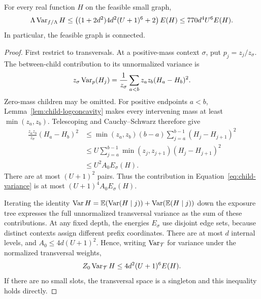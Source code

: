 \begin{theorem}\label{thm:poincare}
For every real function $H$ on the feasible small graph,
\begin{equation}\label{eq:graph-poincare}
 \Lambda\operatorname{Var}_{f/\Lambda}H
 \le \left((1+2d^2)4d^2(U+1)^6+2\right)E(H)
 \le 770d^4U^6 E(H).
\end{equation}
In particular, the feasible graph is connected.
\end{theorem}
\begin{proof}
First restrict to transversals.  At a positive-mass context $\sigma$,
put $p_j=z_j/z_\sigma$.  The between-child contribution to its
unnormalized variance is
\begin{equation}\label{eq:child-variance}
 z_\sigma\operatorname{Var}_p(H_j)
 =\frac1{z_\sigma}\sum_{a<b}z_a z_b(H_a-H_b)^2.
\end{equation}
Zero-mass children may be omitted.  For positive endpoints $a<b$,
Lemma~\ref{lem:child-logconcavity} makes every intervening mass at least
$\min(z_a,z_b)$.  Telescoping and Cauchy--Schwarz therefore give
\begin{align*}
 \frac{z_a z_b}{z_\sigma}(H_a-H_b)^2
 &\le \min(z_a,z_b)(b-a)
             \sum_{j=a}^{b-1}(H_j-H_{j+1})^2\\
 &\le U\sum_{j=a}^{b-1}\min(z_j,z_{j+1})(H_j-H_{j+1})^2\\
 &\le U^2 A_0 E_\sigma(H).
\end{align*}
There are at most $(U+1)^2$ pairs.  Thus the contribution in
Equation~\eqref{eq:child-variance} is at most
$(U+1)^4A_0 E_\sigma(H)$.

Iterating the identity
$\operatorname{Var} H=\mathbb{E}(\operatorname{Var}(H\mid j))+\operatorname{Var}(\mathbb{E}(H\mid j))$ down the exposure tree
expresses the full unnormalized transversal variance as the sum of
these contributions.  At any fixed depth, the energies $E_\sigma$
use disjoint edge sets, because distinct contexts assign different
prefix coordinates.  There are at most $d$ internal levels, and
$A_0\le4d(U+1)^2$.  Hence, writing $\operatorname{Var}_{\mathcal T}$ for variance
under the normalized transversal weights,
\begin{equation}\label{eq:transversal-variance}
 Z_0\operatorname{Var}_{\mathcal T}H\le4d^2(U+1)^6E(H).
\end{equation}
If there are no small slots, the transversal space is a singleton and
this inequality holds directly.


\end{proof}
